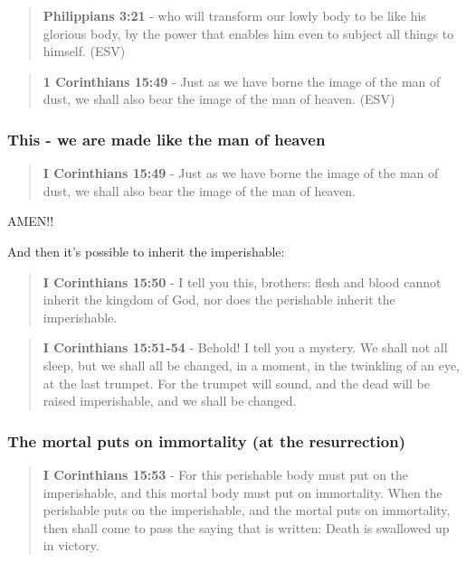 \documentclass[11pt]{article}
\begin{document}
\begin{quote}
\textbf{Philippians 3:21} -  who will transform our lowly body to be like his glorious body, by the power that enables him even to subject all things to himself.  (ESV)
\end{quote}

\begin{quote}
\textbf{1 Corinthians 15:49} -  Just as we have borne the image of the man of dust, we shall also bear the image of the man of heaven.  (ESV)
\end{quote}

\subsubsection{This - we are made like the man of heaven}
\label{sec:org8e6839c}
\begin{quote}
\textbf{I Corinthians 15:49} - Just as we have borne the image of the man of dust, we shall also bear the image of the man of heaven.
\end{quote}

AMEN!!

And then it's possible to inherit the imperishable:

\begin{quote}
\textbf{I Corinthians 15:50} - I tell you this, brothers: flesh and blood cannot inherit the kingdom of God, nor does the perishable inherit the imperishable.
\end{quote}

\begin{quote}
\textbf{I Corinthians 15:51-54} - Behold! I tell you a mystery. We shall not all sleep, but we shall all be changed, in a moment, in the twinkling of an eye, at the last trumpet. For the trumpet will sound, and the dead will be raised imperishable, and we shall be changed.
\end{quote}

\subsubsection{The mortal puts on immortality (at the resurrection)}
\label{sec:orgb2ee31a}
\begin{quote}
\textbf{I Corinthians 15:53} - For this perishable body must put on the imperishable, and this mortal body must put on immortality. When the perishable puts on the imperishable, and the mortal puts on immortality, then shall come to pass the saying that is written: Death is swallowed up in victory.
\end{quote}
\end{document}
